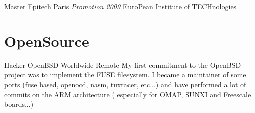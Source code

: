 \documentclass[11pt,a4paper,sans]{moderncv}
\begin{document}
{Master}
{Epitech}
{Paris}
{\textit{Promotion 2009}}
{EuroPean Institute of TECHnologies}


\section{OpenSource}

{Hacker}
{OpenBSD}
{Worldwide Remote}
{}
{My first commitment to the OpenBSD project was to implement the FUSE filesystem.\newline{}
I became a maintainer of some ports (fuse based, openocd, nasm, tuxracer, etc...) and have
performed a lot of commits on the ARM architecture ( especially for OMAP, SUNXI and
Freescale boards...)
}
\end{document}
